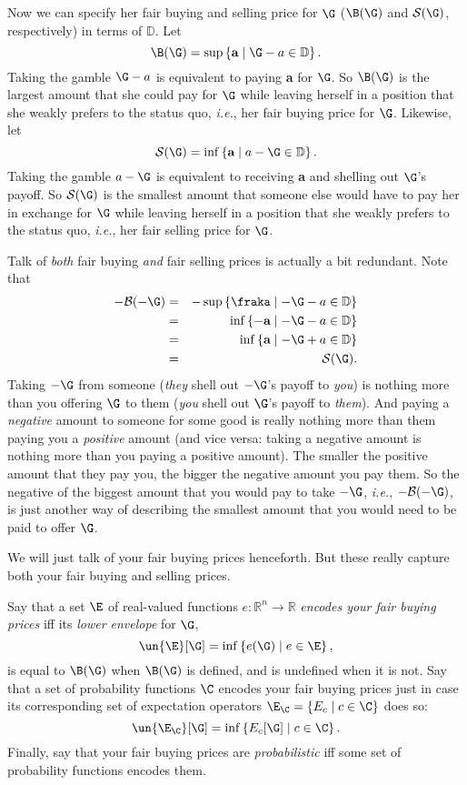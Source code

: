 Now we can specify her fair buying and selling price for $\G$ ($\B(\G)$ and $\mathcal{S}(\G)$, respectively) in terms of $\mathbb{D}$. Let 
$$ \B(\G)=\sup\left\{\textbf{a} \mathrel{|} \G-a\in\mathbb{D}\right\}. $$
Taking the gamble $\G-a$ is equivalent to paying \textsterling\textbf{a} for $\G$. So $\B(\G)$ is the largest amount that she could pay for $\G$ while leaving herself in a position that she weakly prefers to the status quo, \textit{i.e.}, her fair buying price for $\G$. Likewise, let 
$$ \mathcal{S}(\G)=\inf\left\{\textbf{a} \mathrel{|} a-\G\in\mathbb{D}\right\}. $$
Taking the gamble $a-\G$ is equivalent to receiving \textsterling\textbf{a} and shelling out $\G$'s payoff. So $\mathcal{S}(\G)$ is the smallest amount that someone else would have to pay her in exchange for $\G$ while leaving herself in a position that she weakly prefers to the status quo, \textit{i.e.}, her fair selling price for $\G$.

Talk of \textit{both} fair buying \textit{and} fair selling prices is actually a bit redundant. Note that
\begin{eqnarray*}
-\mathcal{B}(-\G) & = & -\sup\left\{\fraka \mathrel{|} -\G-a\in\mathbb{D}\right\}\\
& = & \inf\left\{-\textbf{a} \mathrel{|} -\G-a\in\mathbb{D}\right\}\\
& = & \inf\left\{\textbf{a} \mathrel{|} -\G+a\in\mathbb{D}\right\}\\
& = & \mathcal{S}(\G).
\end{eqnarray*}
Taking $-\G$ from someone (\textit{they} shell out $-\G$'s payoff to \textit{you}) is nothing more than you offering $\G$ to them (\textit{you} shell out $\G$'s payoff to \textit{them}). And paying a \textit{negative} amount to someone for some good is really nothing more than them paying you a \textit{positive} amount (and vice versa: taking a negative amount is nothing more than you paying a positive amount). The smaller the positive amount that they pay you, the bigger the negative amount you pay them. So the negative of the biggest amount that you would pay to take $-\G$, \textit{i.e.}, $-\mathcal{B}(-\G)$, is just another way of describing the smallest amount that you would need to be paid to offer $\G$.

We will just talk of your fair buying prices henceforth. But these really capture both your fair buying and selling prices.

Say that a set $\E$ of real-valued functions $e:\mathbb{R}^n\rightarrow\mathbb{R}$ \textit{encodes your fair buying prices} iff its \textit{lower envelope} for $\G$,
$$ \un{\E}[\G]=\inf\left\{e(\G) \mathrel{|} e\in\E\right\}, $$
is equal to $\B(\G)$ when $\B(\G)$ is defined, and is undefined when it is not. Say that a set of probability functions $\C$ encodes your fair buying prices just in case its corresponding set of expectation operators $\E_\C=\left\{E_c \mathrel{|} c\in\C\right\}$ does so:
$$ \un{\E_\C}[\G]=\inf\left\{E_c[\G] \mathrel{|} c\in\C\right\}. $$
Finally, say that your fair buying prices are \textit{probabilistic} iff some set of probability functions encodes them.

